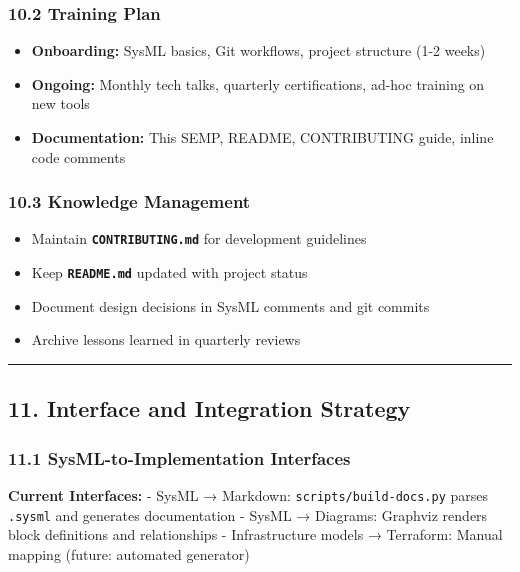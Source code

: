 \documentclass[12pt]{article}
\providecommand{\tightlist}{%
  \setlength{\itemsep}{0pt}\setlength{\parskip}{0pt}}
\begin{document}
\subsubsection{10.2 Training Plan}\label{training-plan}

\begin{itemize}
\tightlist
\item
  \textbf{Onboarding:} SysML basics, Git workflows, project structure
  (1-2 weeks)
\item
  \textbf{Ongoing:} Monthly tech talks, quarterly certifications, ad-hoc
  training on new tools
\item
  \textbf{Documentation:} This SEMP, README, CONTRIBUTING guide, inline
  code comments
\end{itemize}

\subsubsection{10.3 Knowledge Management}\label{knowledge-management}

\begin{itemize}
\tightlist
\item
  Maintain \textbf{\texttt{CONTRIBUTING.md}} for development guidelines
\item
  Keep \textbf{\texttt{README.md}} updated with project status
\item
  Document design decisions in SysML comments and git commits
\item
  Archive lessons learned in quarterly reviews
\end{itemize}

\begin{center}\rule{0.5\linewidth}{0.5pt}\end{center}

\subsection{11. Interface and Integration
Strategy}\label{interface-and-integration-strategy}

\subsubsection{11.1 SysML-to-Implementation
Interfaces}\label{sysml-to-implementation-interfaces}

\textbf{Current Interfaces:} - SysML → Markdown:
\texttt{scripts/build-docs.py} parses \texttt{.sysml} and generates
documentation - SysML → Diagrams: Graphviz renders block definitions and
relationships - Infrastructure models → Terraform: Manual mapping
(future: automated generator)
\end{document}
